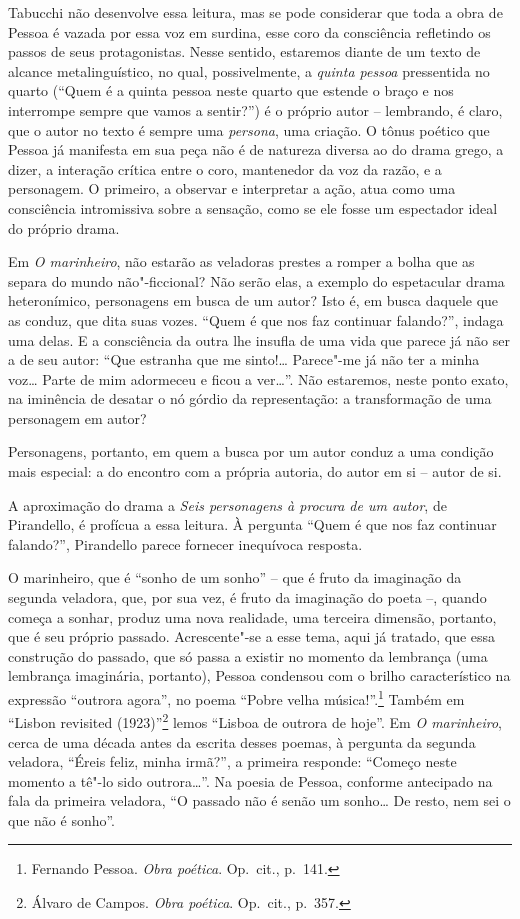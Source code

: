 Tabucchi não desenvolve essa leitura, mas se pode considerar que toda a
obra de Pessoa é vazada por essa voz em surdina, esse coro da
consciência refletindo os passos de seus protagonistas. Nesse sentido,
estaremos diante de um texto de alcance metalinguístico, no qual,
possivelmente, a \textit{quinta pessoa} pressentida no quarto (“Quem é
a quinta pessoa neste quarto que estende o braço e nos interrompe
sempre que vamos a sentir?”) é o próprio autor -- lembrando, é claro,
que o autor no texto é sempre uma
\textit{persona}, uma criação. O
tônus poético que Pessoa já manifesta em sua peça não é de natureza
diversa ao do drama grego, a dizer, a interação crítica entre o coro,
mantenedor da voz da razão, e a personagem. O primeiro, a observar e
interpretar a ação, atua como uma consciência intromissiva sobre a
sensação, como se ele fosse um espectador ideal do próprio drama. 

Em \textit{O marinheiro}, não estarão as veladoras prestes a romper a
bolha que as separa do mundo não"-ficcional? Não serão elas, a exemplo do
espetacular drama heteronímico, personagens em busca de um autor? Isto
é, em busca daquele que as conduz, que dita suas vozes. “Quem é que nos
faz continuar falando?”, indaga uma delas. E a consciência da outra lhe
insufla de uma vida que parece já não ser a de seu autor: “Que estranha
que me sinto!\ldots{} Parece"-me já não ter a minha voz\ldots{} Parte de mim
adormeceu e ficou a ver\ldots{}”. Não estaremos, neste ponto exato, na
iminência de desatar o nó górdio da representação: a transformação de
uma personagem em autor? 

Personagens, portanto, em quem a busca por um autor conduz a uma
condição mais especial: a do encontro com a própria autoria, do autor
em si -- autor de si.

A aproximação do drama a \textit{Seis personagens à procura de um
autor}, de Pirandello, é profícua a essa leitura. À pergunta “Quem é
que nos faz continuar falando?”, Pirandello parece fornecer
inequívoca resposta.

O marinheiro, que é “sonho de um sonho” -- que é
fruto da imaginação da segunda veladora, que, por sua vez, é fruto da
imaginação do poeta --, quando começa a sonhar, produz uma nova
realidade, uma terceira dimensão, portanto, que é seu próprio passado.
Acrescente"-se a esse tema, aqui já tratado, que essa construção do passado, que só passa a existir no momento da
lembrança (uma lembrança imaginária, portanto), Pessoa condensou com o
brilho característico na expressão “outrora agora”, no poema “Pobre
velha música!”.\footnote{ Fernando Pessoa. \textit{Obra poética}. Op.~cit.,
p.~141.} Também em “Lisbon revisited (1923)”\footnote{ 
Álvaro de Campos. \textit{Obra poética}. Op.~cit., p.~357.} lemos “Lisboa de
outrora de hoje”. Em \textit{O marinheiro}, cerca de uma
década antes da escrita desses poemas, à pergunta da segunda veladora,
“Éreis feliz, minha irmã?”, a primeira responde: “Começo neste momento
a tê"-lo sido outrora\ldots{}”. Na poesia de Pessoa, conforme antecipado na
fala da primeira veladora, “O passado não é senão um sonho\ldots{} De resto,
nem sei o que não é sonho”.

